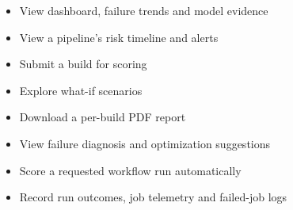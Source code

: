 \begin{itemize}
\item View dashboard, failure trends and model evidence
\item View a pipeline's risk timeline and alerts
\item Submit a build for scoring
\item Explore what-if scenarios
\item Download a per-build PDF report
\item View failure diagnosis and optimization suggestions
\item Score a requested workflow run automatically
\item Record run outcomes, job telemetry and failed-job logs
\end{itemize}
